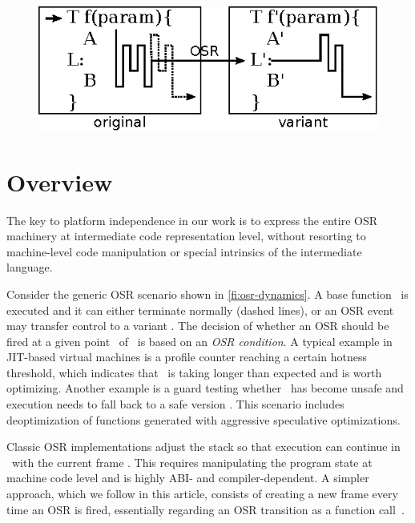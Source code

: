 
\ifdefined\noauthorea
\begin{figure}[t]
\begin{center}
\includegraphics[width=0.6\columnwidth]{figures/overview-osr/overview-osr.eps}
\caption{\protect}
\end{center}
\end{figure}
\fi

\section{Overview}
\label{se:overview}

The key to platform independence in our work is to express the entire OSR machinery at intermediate code representation level, without resorting to machine-level code manipulation or special intrinsics of the intermediate language. %


Consider the generic OSR scenario shown in \myfigure\ref{fi:osr-dynamics}. A base function \fbase\ is executed and it can either terminate normally (dashed lines), or an OSR event may transfer control to a variant \fvariant. The decision of whether an OSR should be fired at a given point \osrpoint\ of \fbase\ is based on an {\em OSR condition}. A typical example in JIT-based virtual machines is a profile counter reaching a certain hotness threshold, which indicates that \fbase\ is taking longer than expected and is worth optimizing. Another example is a guard testing whether \fbase\ has become unsafe and execution needs to fall back to a safe version \fvariant. This scenario includes deoptimization of functions generated with aggressive speculative optimizations. 

Classic OSR implementations adjust the stack so that execution can continue in \fvariant\ with the current frame \cite{chambers1992design}. This requires manipulating the program state at machine code level and is highly ABI- and compiler-dependent. A simpler approach, which we follow in this article, consists of creating a new frame every time an OSR is fired, essentially regarding an OSR transition as a function call~\cite{Lameed_2013,webkit14}. 

